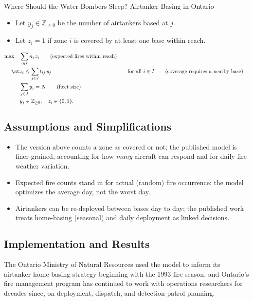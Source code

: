\begin{casestudybox}{Where Should the Water Bombers Sleep? Airtanker Basing in Ontario}
\begin{itemize}
\item Let $y_j \in \mathbb{Z}_{\geq 0}$ be the number of airtankers based at $j$.
\item Let $z_i = 1$ if zone $i$ is covered by at least one base within reach.
\end{itemize}

\begin{align*}
\max \quad & \sum_{i \in I} n_i \, z_i   \tag{expected fires within reach} \\
\st        & z_i \leq \sum_{j \in J} t_{ij}\, y_j &&\quad \text{for all } i \in I   \tag{coverage requires a nearby base} \\
             & \sum_{j \in J} y_j = N   \tag{fleet size} \\
             & y_j \in \mathbb{Z}_{\geq 0}, \quad z_i \in \{0,1\}.
\end{align*}

\subsection*{Assumptions and Simplifications}
\begin{itemize}
\item The version above counts a zone as covered or not; the published model is finer-grained, accounting for how \emph{many} aircraft can respond and for daily fire-weather variation.
\item Expected fire counts stand in for actual (random) fire occurrence: the model optimizes the average day, not the worst day.
\item Airtankers can be re-deployed between bases day to day; the published work treats home-basing (seasonal) and daily deployment as linked decisions.
\end{itemize}

\subsection*{Implementation and Results}
The Ontario Ministry of Natural Resources used the model to inform its airtanker home-basing strategy beginning with the 1993 fire season, and Ontario's fire management program has continued to work with operations researchers for decades since, on deployment, dispatch, and detection-patrol planning.


\end{casestudybox}
